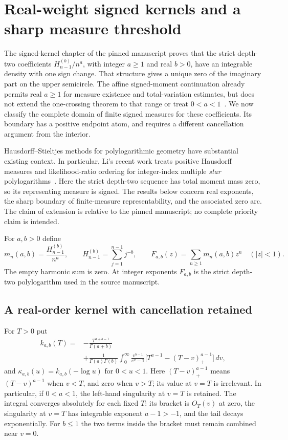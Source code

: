 \section{Real-weight signed kernels and a sharp measure threshold}
\label{real:sec:kernels}

The signed-kernel chapter of the pinned manuscript proves that the strict
depth-two coefficients $H_{n-1}^{(b)}/n^a$, with integer $a\geq1$ and real
$b>0$, have an integrable density with one sign change. That structure
gives a unique zero of the imaginary part on the upper semicircle.
The affine signed-moment continuation already permits real $a\geq1$
for measure existence and total-variation estimates, but does not extend
the one-crossing theorem to that range or treat $0<a<1$~\cite{ProveIt}.
We now classify the complete domain of finite signed measures for these
coefficients. Its boundary has a positive endpoint atom, and requires a
different cancellation argument from the interior.

Hausdorff--Stieltjes methods for polylogarithmic geometry have substantial
existing context. In particular, Li's recent work treats positive
Hausdorff measures and likelihood-ratio ordering for integer-index
multiple \emph{star} polylogarithms~\cite{Li2026}. Here the strict
depth-two sequence has total moment mass zero, so its representing
measure is signed. The results below concern real exponents, the sharp
boundary of finite-measure representability, and the associated zero
arc. The claim of extension is relative to the pinned manuscript; no
complete priority claim is intended.

For $a,b>0$ define
\begin{equation}\label{real:eq:def}
 m_n(a,b)=\frac{H_{n-1}^{(b)}}{n^a},\qquad
 H_{n-1}^{(b)}=\sum_{j=1}^{n-1}j^{-b},\qquad
 F_{a,b}(z)=\sum_{n\geq1}m_n(a,b)z^n\quad(|z|<1).
\end{equation}
The empty harmonic sum is zero. At integer exponents $F_{a,b}$ is the
strict depth-two polylogarithm used in the source manuscript.

\subsection{A real-order kernel with cancellation retained}

For $T>0$ put
\begin{equation}\label{real:eq:kernel}
\begin{split}
 k_{a,b}(T)={}&-\frac{T^{a+b-1}}{\Gamma(a+b)}\\
 &+\frac1{\Gamma(a)\Gamma(b)}
  \int_0^\infty\frac{v^{b-1}}{e^v-1}
    \bigl[T^{a-1}-(T-v)_+^{a-1}\bigr]\,dv,
\end{split}
\end{equation}
and $\kappa_{a,b}(u)=k_{a,b}(-\log u)$ for $0<u<1$.
Here $(T-v)_+^{a-1}$ means $(T-v)^{a-1}$ when $v<T$, and zero when
$v>T$; its value at $v=T$ is irrelevant. In particular, if $0<a<1$,
the left-hand singularity at $v=T$ is retained. The integral converges
absolutely for each fixed $T$: its bracket is $O_T(v)$ at zero, the
singularity at $v=T$ has integrable exponent $a-1>-1$, and the tail
decays exponentially. For $b\leq1$ the two terms inside the bracket
must remain combined near $v=0$.


